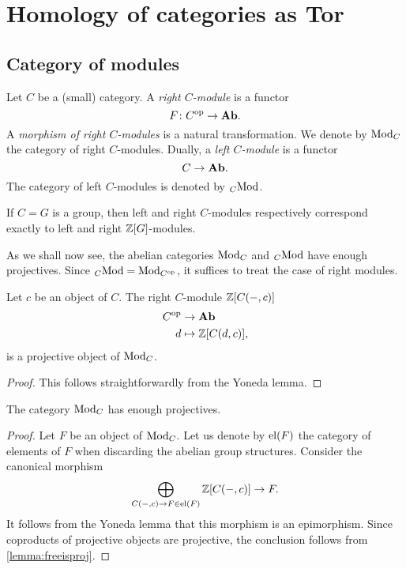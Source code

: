 \section{Homology of categories as Tor}
\subsection{Category of modules}
\begin{definition}
  Let $C$ be a (small) category. A \emph{right $C$\nbd-module} is a
  functor
  \[
    F \colon C^{{\mathrm{op}}} \to \mathbf{Ab}.
  \]
  A \emph{morphism of right $C$\nbd-modules} is a natural
  transformation. We denote by $\mathrm{Mod}_{C}$ the category of right
  $C$\nbd-modules. Dually, a \emph{left $C$\nbd-module} is a functor
  \[
    C \to \mathbf{Ab}.
  \]
  The category of left $C$\nbd-modules is denoted by ${}_{C}\mathrm{Mod}$.
\end{definition}
\begin{example}
  If $C=G$ is a group, then left and right $C$\nbd-modules
  respectively correspond
  exactly to left and right $\mathbb Z[G]$\nbd-modules. 
\end{example}

As we shall now see, the abelian categories $\mathrm{Mod}_{C}$ and ${}_{C}\mathrm{Mod}$
have enough projectives. Since ${}_{C}\mathrm{Mod}=\mathrm{Mod}_{C^{{\mathrm{op}}}}$, it suffices
to treat the case of right modules.

\begin{lemma}\label{lemma:freeisproj}
  Let $c$ be an object of $C$. The right $C$\nbd-module $\mathbb Z[C(-,c)]$
  \[
    \begin{aligned}
      C^{{\mathrm{op}}} &\to \mathbf{Ab}\\
      d &\mapsto \mathbb Z[C(d,c)],
    \end{aligned}
  \]
  is a projective object of $\mathrm{Mod}_{C}$.
\end{lemma}
\begin{proof}
  This follows straightforwardly from the Yoneda lemma.
\end{proof}
\begin{proposition}\label{prop:enoughproj}
  The category $\mathrm{Mod}_{C}$ has enough projectives.
\end{proposition}
\begin{proof}
  Let $F$ be an object of $\mathrm{Mod}_{C}$. Let us denote by $\mathrm{el}(F)$ the
  category of elements of $F$ when discarding the abelian group
  structures. Consider the canonical
  morphism
  \[
    \bigoplus_{C(-,c) \to F \in \mathrm{el}(F)} \mathbb Z[C(-,c)] \to F.
  \]
 It follows from the Yoneda lemma that this morphism is
  an epimorphism. Since coproducts of projective objects
  are projective, the conclusion follows from \cref{lemma:freeisproj}.
\end{proof}
